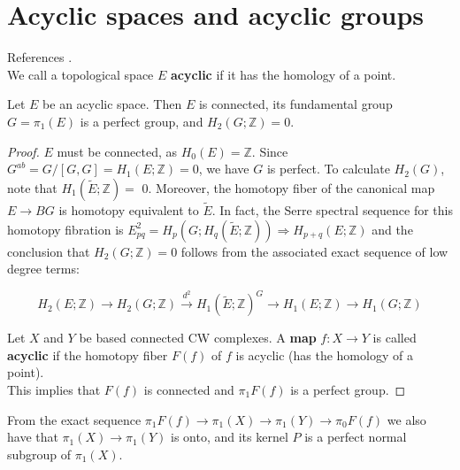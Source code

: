 \section{Acyclic spaces and acyclic groups}

References \cite{karoubiContemporaryDevelopmentsAlgebraic2003,srinivasAlgebraicKTheory1996,weibelKbookIntroductionAlgebraic2013a}.\\

 We call a topological space $E$ \textbf{acyclic} if it has the homology of a point.

\begin{lemm}
    Let $E$ be an acyclic space. Then $E$ is connected, its fundamental group $G=\pi_1(E)$ is a perfect group, and $H_2(G ; \mathbb{Z})=0$.
\end{lemm}
\begin{proof}
    
$E$ must be connected, as $H_0(E)=\mathbb{Z}$. Since $G^{ab} =G /[G, G]=H_1(E ; \mathbb{Z})=0$, we have $G$ is perfect. To calculate $H_2(G)$, note that $H_1(\tilde{E} ; \mathbb{Z})=$ 0. Moreover, the homotopy fiber of the canonical map $E \rightarrow B G$ is homotopy equivalent to $\tilde{E}$. In fact, the Serre spectral sequence for this homotopy fibration is $E_{p q}^2=H_p\left(G ; H_q(\tilde{E} ; \mathbb{Z})\right) \Rightarrow H_{p+q}(E ; \mathbb{Z})$ and the conclusion that $H_2(G ; \mathbb{Z})=0$ follows from the associated exact sequence of low degree terms:

$$
H_2(E ; \mathbb{Z}) \rightarrow H_2(G ; \mathbb{Z}) \xrightarrow{d^2} H_1(\tilde{E} ; \mathbb{Z})^G \rightarrow H_1(E ; \mathbb{Z}) \rightarrow H_1(G ; \mathbb{Z})
$$



Let $X$ and $Y$ be based connected CW complexes. A \textbf{map} $f: X \rightarrow Y$ is called \textbf{acyclic} if the homotopy fiber $F(f)$ of $f$ is acyclic (has the homology of a point).\\
This implies that $F(f)$ is connected and $\pi_1 F(f)$ is a perfect group.
\end{proof}

From the exact sequence $\pi_1 F(f) \rightarrow \pi_1(X) \rightarrow \pi_1(Y) \rightarrow \pi_0 F(f)$ we also have that $\pi_1(X) \rightarrow \pi_1(Y)$ is onto, and its kernel $P$ is a perfect normal subgroup of $\pi_1(X)$.\\

